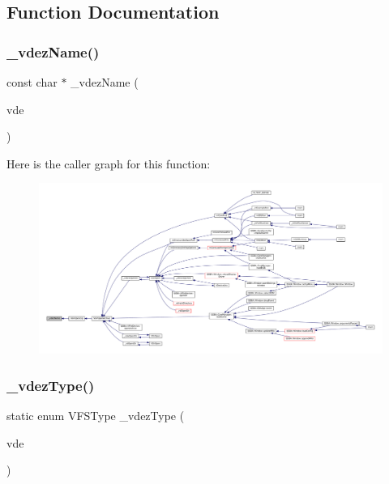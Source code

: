 \subsection{Function Documentation}
\mbox{\label{vfs-zip_8c_a8c5eb3d1849f409a7238bee594d0b139}} 
\subsubsection{\texorpdfstring{\+\_\+vdez\+Name()}{\_vdezName()}}
{\footnotesize\ttfamily const char $\ast$ \+\_\+vdez\+Name (\begin{DoxyParamCaption}\item[{struct V\+Dir\+Entry $\ast$}]{vde }\end{DoxyParamCaption})\hspace{0.3cm}{\ttfamily [static]}}

Here is the caller graph for this function\+:
\nopagebreak
\begin{figure}[H]
\begin{center}
\leavevmode
\includegraphics[width=350pt]{vfs-zip_8c_a8c5eb3d1849f409a7238bee594d0b139_icgraph}
\end{center}
\end{figure}
\mbox{\label{vfs-zip_8c_abefae5482409acabbad9ccb2549f1c35}} 
\subsubsection{\texorpdfstring{\+\_\+vdez\+Type()}{\_vdezType()}}
{\footnotesize\ttfamily static enum V\+F\+S\+Type \+\_\+vdez\+Type (\begin{DoxyParamCaption}\item[{struct V\+Dir\+Entry $\ast$}]{vde }\end{DoxyParamCaption})\hspace{0.3cm}{\ttfamily [static]}}

